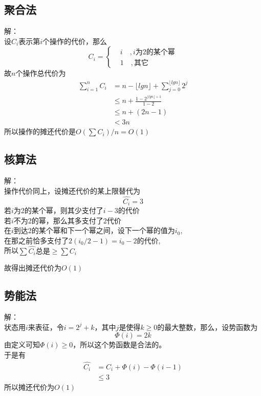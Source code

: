\documentclass[cn,11pt,chinese]{elegantbook}
\begin{document}
\subsection{聚合法}
解：\\
设$C_i$表示第$i$个操作的代价，那么
\begin{equation}
	C_i = \left\{ 
		\begin{aligned}
			&i \quad,i\mbox{为2的某个幂} \\
			&1 \quad,\mbox{其它}
		\end{aligned}
    \right. \nonumber
\end{equation}
故$n$个操作总代价为
\begin{equation}
	\begin{aligned}
		\sum_{i=1}^n C_i&= n-\lfloor lgn\rfloor  +\sum_{j = 0}^{\lfloor lgn \rfloor } 2^j \\
						&\le n + \frac{1-2^{\lfloor lgn\rfloor +1}}{1-2} \\
						&\le n + (2n-1) \\
						&< 3n 
	\end{aligned} 
	\nonumber
\end{equation}
所以操作的摊还代价是$O (\sum C_i) / n = O (1)$

\subsection{核算法}
解： \\
操作代价同上，设摊还代价的某上限替代为
\begin{equation}
	\hat{C_i} = 3 \nonumber  
\end{equation}
若$i$为2的某个幂，则其少支付了$i-3$的代价\\
若$i$不为2的幂，那么其多支付了2代价\\
在$i$到达2的某个幂和下一个幂之间，设下一个幂的值为$i_0$,\\
在那之前恰多支付了$2(i_0/2-1)=i_0 -2$的代价,\\
所以$\sum \hat{C_i}\mbox{总是}\ge \sum C_i$

故得出摊还代价为$O (1)$

\subsection{势能法}
解： \\
状态用$i$来表征，令$i = 2^j + k$，其中$j$是使得$k \ge 0$的最大整数，那么，设势函数为
\begin{equation}
	\Phi (i) = 2k \nonumber
\end{equation}
由定义可知$\Phi (i) \ge 0$，所以这个势函数是合法的。\\
于是有
\begin{equation}
	\begin{aligned}
		\hat{C_i} &= C_i + \Phi (i) - \Phi (i-1) \\
				&\le 3
	\end{aligned}
	\nonumber
\end{equation}
所以摊还代价为$O(1)$
\end{document}
